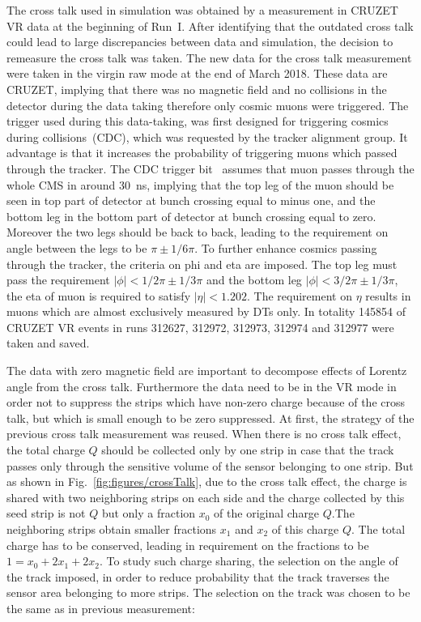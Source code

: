 The cross talk used in simulation was obtained by a measurement in CRUZET VR data at the beginning of Run~I. After identifying that the outdated cross talk could lead to large discrepancies between data and simulation, the decision  to remeasure the cross talk was taken. The new data for the cross talk measurement were taken in the virgin raw mode at the end of March 2018. These data are CRUZET, implying that there was no magnetic field and no collisions in the detector during the data taking therefore only cosmic muons were triggered. The trigger used during this data-taking, was first designed for triggering cosmics during collisions~(CDC), which was requested by the tracker alignment group. It advantage is that it increases the probability of triggering muons which passed through the tracker. The CDC trigger bit~\cite{website:trigger} assumes that muon passes through the whole CMS in around 30~ns, implying that the top leg of the muon should be seen in top part of detector at bunch crossing equal to minus one, and the bottom leg in the bottom part of detector at bunch crossing equal to zero. Moreover the two legs should be back to back, leading to the requirement on angle between the legs to be $\pi \pm 1/6\pi$. To further enhance cosmics passing through the tracker, the criteria on phi and eta are imposed. The top leg must pass the requirement $|\phi|<1/2\pi \pm 1/3\pi$ and the bottom leg $|\phi|<3/2\pi \pm 1/3\pi$, the eta of muon is required to satisfy $|\eta|<1.202$. The requirement on $\eta$ results in muons which are almost exclusively measured by DTs only. In totality 145854 of CRUZET VR events in runs 312627, 312972, 312973, 312974 and 312977 were taken and saved.

The data with zero magnetic field are important to decompose effects of Lorentz angle from the cross talk. Furthermore the data need to be in the VR mode in order not to suppress the strips which have non-zero charge because of the cross talk, but which is small enough to be zero suppressed. At first, the strategy of the previous cross talk measurement was reused. When there is no cross talk effect, the total charge $Q$ should be collected only by one strip in case that the track passes only through the sensitive volume of the sensor belonging to one strip. But as shown in Fig.~\ref{fig:figures/crossTalk}, due to the cross talk effect, the charge is shared with two neighboring strips on each side and the charge collected by this seed strip is not $Q$ but only a fraction $x_{0}$ of the original charge $Q$.The neighboring strips obtain smaller fractions $x_{1}$ and $x_{2}$ of this charge $Q$. The total charge has to be conserved, leading in requirement on the fractions to be $1=x_{0}+2x_{1}+2x_{2}$. To study such charge sharing, the selection on the angle of the track imposed, in order to reduce probability that the track traverses the sensor area belonging to more strips. The selection on the track was chosen to be the same as in previous measurement:


